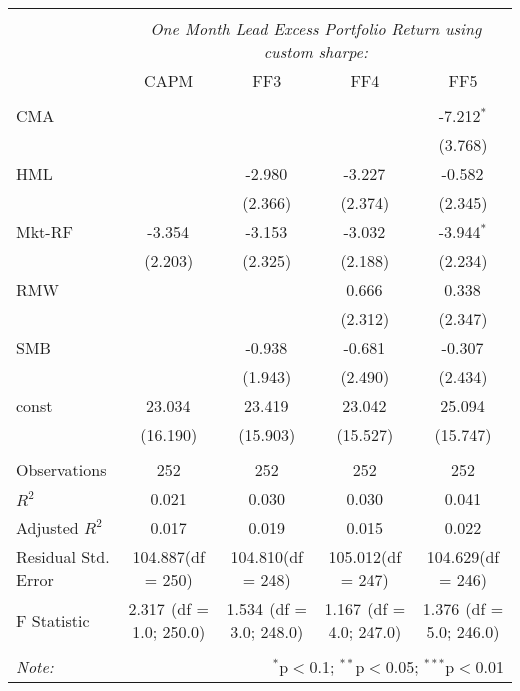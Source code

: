 \begin{table}[!htbp] \centering
\begin{tabular}{@{\extracolsep{5pt}}lcccc}
\\[-1.8ex]\hline
\hline \\[-1.8ex]
& \multicolumn{4}{c}{\textit{One Month Lead Excess Portfolio Return using custom sharpe:}} \
\cr \cline{4-5}
\\[-1.8ex] & CAPM & FF3 & FF4 & FF5 \\
\hline \\[-1.8ex]
 CMA & & & & -7.212$^{*}$ \\
  & & & & (3.768) \\
 HML & & -2.980$^{}$ & -3.227$^{}$ & -0.582$^{}$ \\
  & & (2.366) & (2.374) & (2.345) \\
 Mkt-RF & -3.354$^{}$ & -3.153$^{}$ & -3.032$^{}$ & -3.944$^{*}$ \\
  & (2.203) & (2.325) & (2.188) & (2.234) \\
 RMW & & & 0.666$^{}$ & 0.338$^{}$ \\
  & & & (2.312) & (2.347) \\
 SMB & & -0.938$^{}$ & -0.681$^{}$ & -0.307$^{}$ \\
  & & (1.943) & (2.490) & (2.434) \\
 const & 23.034$^{}$ & 23.419$^{}$ & 23.042$^{}$ & 25.094$^{}$ \\
  & (16.190) & (15.903) & (15.527) & (15.747) \\
\hline \\[-1.8ex]
 Observations & 252 & 252 & 252 & 252 \\
 $R^2$ & 0.021 & 0.030 & 0.030 & 0.041 \\
 Adjusted $R^2$ & 0.017 & 0.019 & 0.015 & 0.022 \\
 Residual Std. Error & 104.887(df = 250) & 104.810(df = 248) & 105.012(df = 247) & 104.629(df = 246)  \\
 F Statistic & 2.317$^{}$ (df = 1.0; 250.0) & 1.534$^{}$ (df = 3.0; 248.0) & 1.167$^{}$ (df = 4.0; 247.0) & 1.376$^{}$ (df = 5.0; 246.0) \\
\hline
\hline \\[-1.8ex]
\textit{Note:} & \multicolumn{4}{r}{$^{*}$p$<$0.1; $^{**}$p$<$0.05; $^{***}$p$<$0.01} \\
\end{tabular}
\end{table}
